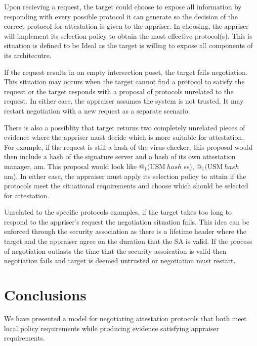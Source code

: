 \documentclass[sigconf,authordraft]{acmart}
\begin{document}
Upon recieving a request, the target could choose to expose all
information by responding with every possible protocol it can generate
so the decision of the correct protocol for attestation is given to
the appriser. In choosing, the appriser will implement its selection
policy to obtain the most effective protocol(s). This is situation is
defined to be \gls{Ideal} as the target is willing to expose all
components of its architecutre.

If the request results in an empty intersection poset, the target
fails negotiation. This situation may occurs when the target cannot
find a protocol to satisfy the request or the target responds with a
proposal of protocols unrelated to the request. In either case, the
appraiser assumes the system is not trusted. It may restart
negotiation with a new request as a separate scenario.

There is also a possiblity that target returns two completely
unrelated pieces of evidence where the appriser must decide which is
more suitable for attestation. For example, if the request is still a
hash of the virus checker, this proposal would then include a hash of
the signature server and a hash of its own attestation manager,
am. This proposal would look like {$@_1 (\text{USM}\: hash$ ss),
  $@_1 (\text{USM}\: hash$ am)}. In either case, the appraiser must
apply its selection policy to attain if the protocols meet the
situational requirements and choose which should be selected for
attestation.


Unrelated to the specific protocols examples, if the target takes too
long to respond to the appriser's request the negotiation situation
fails. This idea can be enforced through the security association as
there is a lifetime header where the target and the appraiser agree on
the duration that the SA is valid. If the process of negotiation
outlasts the time that the security assoication is valid then
negotiation fails and target is deemed untrusted or negotiation must
restart.

\printglossary \glsaddallunused




\section{Conclusions}

We have presented a model for negotiating attestation protocols that
both meet local policy requirements while producing evidence
satisfying appraiser requirements.

\nocite{Coker::Principles-of-R,Ramsdell:2019aa,Petz:2019aa,Davey:02:Introduction-to}

 
\end{document}
